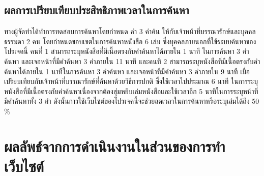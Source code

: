 \subsection{ผลการเปรียบเทียบประสิทธิภาพเวลาในการค้นหา}
ทางผู้จัดทำได้ทำการทดสอบการค้นหาโดยกำหนด คำ 3 คำค้น ให้กับเจ้าหน้าที่บรรณารักษ์และบุคคลธรรมดา 
2 คน โดยกำหนดขอบเขตในการค้นหาหนังสือ 6 เล่ม ซึ่งบุคคลภายนอกที่ใช้ระบบค้นหาของโปรเจคนี้ คนที่ 1 
สามารถระบุหนังสือที่มีเนื้อตรงกับคำค้นหาได้ภายใน 1 นาที ในการค้นหา 3 คำค้นหา และเจอหน้าที่มีคำค้นหา 
3 คำภายใน 11 นาที และคนที่ 2 สามารถระบุหนังสือที่มีเนื้อตรงกับคำค้นหาได้ภายใน 1 นาทีในการค้นหา 3 
คำค้นหา และเจอหน้าที่มีคำค้นหา 3 คำภายใน 9 นาที เมื่อเปรียบเทียบกับเจ้าหน้าที่บรรณารักษ์ที่ค้นหาด้วยวิธีการปกติ 
ซึ่งใช้เวลาไปประมาณ 6 นาที ในการระบุหนังสือที่มีเนื้อตรงกับคำค้นหาเนื่องจากต้องสุ่มหยิบเล่มหนังสือและใช้เวลาอีก 
5 นาทีในการระบุหน้าที่มีคำค้นหาทั้ง 3 คำ ดังนั้นการใช้เว็บไซต์ของโปรเจคนี้จะช่วยลดเวลาในการค้นหาหรือระบุเล่มได้ถึง 50 \% 

\section{ผลลัพธ์จากการดำเนินงานในส่วนของการทำเว็บไซต์}

